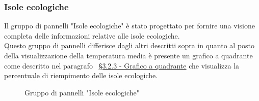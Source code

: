 \subsubsection{Isole ecologiche}
Il gruppo di pannelli "Isole ecologiche" è stato progettato per fornire una visione completa delle informazioni relative alle isole ecologiche.\\
Questo gruppo di pannelli differisce dagli altri descritti sopra in quanto al posto della visualizzazione della temperatura media è presente un grafico a quadrante come descritto nel paragrafo ~\hyperlink{par:grafico_quadrante}{\S 3.2.3 - Grafico a quadrante} che visualizza la percentuale di riempimento delle isole ecologiche.\\
\begin{figure}[H]
    \centering
    \caption{Gruppo di pannelli "Isole ecologiche"}
    \label{fig:my_label}
\end{figure}


